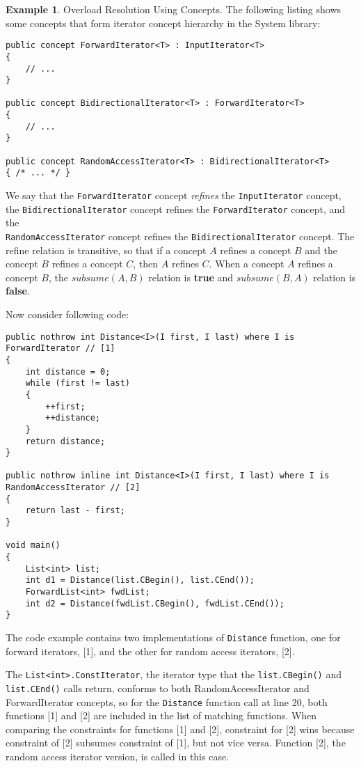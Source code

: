 \documentclass[a4paper,oneside,11pt]{book}
\theoremstyle{definition}
\newtheorem{exmp}{Example}[section]
\begin{document}
\begin{exmp} Overload Resolution Using Concepts.
The following listing shows some concepts that form iterator concept hierarchy in the System library:
\begin{flushleft}
\lstset{language=Cmajor}
\begin{lstlisting}[frame=trBL]
public concept ForwardIterator<T> : InputIterator<T>
{
    // ...
}

public concept BidirectionalIterator<T> : ForwardIterator<T>
{
    // ...
}

public concept RandomAccessIterator<T> : BidirectionalIterator<T>
{ /* ... */ }
\end{lstlisting}
\end{flushleft}

We say that the \verb|ForwardIterator| concept \emph{refines} the \verb|InputIterator| concept,\\
the \verb|BidirectionalIterator| concept refines the \verb|ForwardIterator| concept, and the\\
\verb|RandomAccessIterator| concept refines the \verb|BidirectionalIterator| concept.
The refine relation is transitive, so that if a concept $A$ refines a concept $B$ and
the concept $B$ refines a concept $C$, then $A$ refines $C$.
When a concept $A$ refines a concept $B$, the $subsume(A, B)$ relation is \textbf{true} and
$subsume(B, A)$ relation is \textbf{false}.

Now consider following code:
\begin{flushleft}
\lstset{language=Cmajor}
\begin{lstlisting}[frame=trBL]
public nothrow int Distance<I>(I first, I last) where I is ForwardIterator // [1]
{
    int distance = 0;
    while (first != last)
    {
        ++first;
        ++distance;
    }
    return distance;
}

public nothrow inline int Distance<I>(I first, I last) where I is RandomAccessIterator // [2]
{
    return last - first;
}

void main()
{
    List<int> list;
    int d1 = Distance(list.CBegin(), list.CEnd());
    ForwardList<int> fwdList;
    int d2 = Distance(fwdList.CBegin(), fwdList.CEnd());
}
\end{lstlisting}
\end{flushleft}
The code example contains two implementations of \verb|Distance| function, one for forward iterators, [1], and
the other for random access iterators, [2].

The \verb|List<int>.ConstIterator|, the iterator type that the \verb|list.CBegin()| and \verb|list.CEnd()| calls return,
conforms to both RandomAccessIterator and ForwardIterator concepts,
so for the \verb|Distance| function call at line 20, both functions [1] and [2] are included in the list of matching functions.
When comparing the constraints for functions [1] and [2], constraint for [2] wins because constraint of [2] subsumes constraint of [1], but not vice versa.
Function [2], the random access iterator version, is called in this case.


\end{exmp}
\end{document}
